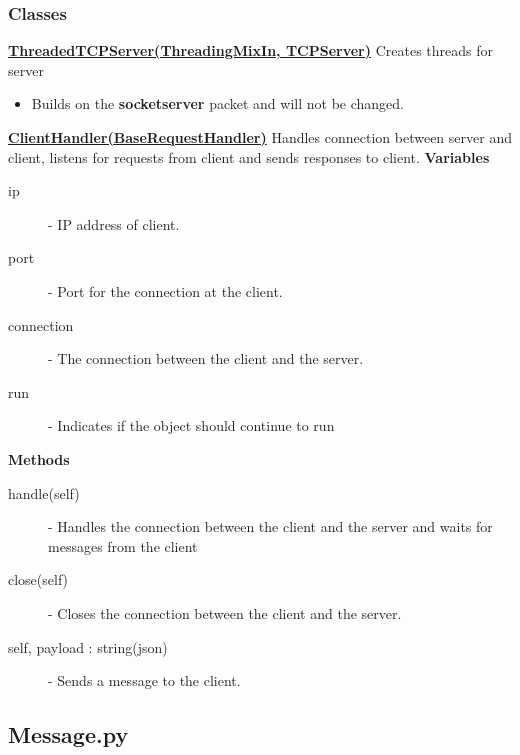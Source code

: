 \documentclass[a4paper, 12pt]{article}
\begin{document}
        \subsubsection{Classes}
            \textbf{\underline{ThreadedTCPServer(ThreadingMixIn, TCPServer)}}
            \newline
            \newline
            Creates threads for server
            \begin{itemize}
                \item Builds on the \textbf{socketserver} packet and will not be changed.
            \end{itemize}
            \textbf{\underline{ClientHandler(BaseRequestHandler)}}
            \newline
            \newline
                Handles connection between server and client, listens for requests from client and sends responses to client.
                \newline
                \newline
                \textbf{Variables}
                    \begin{description}
                        \item[ip] - IP address of client.
                        \item[port] - Port for the connection at the client.
                        \item[connection] - The connection between the client and the server.
                        \item[run] - Indicates if the object should continue to run
                    \end{description}
                \textbf{Methods}
                    \begin{description}
                        \item[handle(self)] - Handles the connection between the client and the server and waits for messages from the client
                        \item[close(self)] - Closes the connection between the client and the server.
                        \item[self, payload : string(json)] - Sends a message to the client.
                    \end{description}
    \subsection{Message.py}
\end{document}
